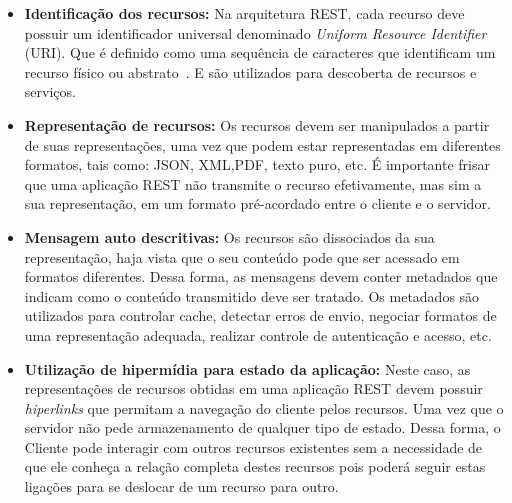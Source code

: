  \begin{itemize}
    \item \textbf{Identificação dos recursos:} Na arquitetura REST, cada recurso deve possuir um identificador universal denominado \emph{Uniform Resource Identifier} (URI). Que é definido como uma sequência de caracteres que identificam um recurso físico ou abstrato~\cite{bernerslee2005uri}. E são utilizados para descoberta de recursos e serviços.
    \item	\textbf{Representação de recursos:} Os recursos devem ser manipulados a partir de suas representações, uma vez que podem estar representadas em diferentes formatos, tais como: JSON, XML,PDF, texto puro, etc. É importante frisar que uma aplicação REST não transmite o recurso efetivamente, mas sim a sua representação, em um formato pré-acordado entre o cliente e o servidor.
    \item	\textbf{Mensagem auto descritivas:} Os recursos são dissociados da sua representação, haja vista que o seu conteúdo  pode que ser acessado em formatos diferentes. Dessa forma, as mensagens devem conter metadados que indicam como o conteúdo transmitido deve ser tratado.  Os metadados são utilizados para controlar cache, detectar erros de envio, negociar formatos de uma representação adequada, realizar controle de autenticação e acesso, etc.
    \item	\textbf{Utilização de hipermídia para estado da aplicação:} Neste caso, as representações de recursos obtidas em uma aplicação REST devem possuir \emph{hiperlinks} que permitam a navegação do cliente pelos recursos. Uma vez que o servidor não pede  armazenamento de qualquer tipo de estado. Dessa forma, o Cliente pode interagir com outros recursos existentes sem a necessidade de que ele conheça a relação completa destes recursos pois poderá seguir estas ligações para se deslocar de um recurso para outro.


\end{itemize}

